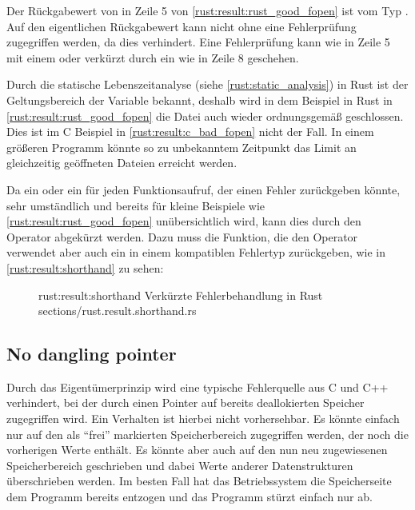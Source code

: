 Der Rückgabewert von  in Zeile 5 von \autoref{rust:result:rust_good_fopen} ist vom Typ .
Auf den eigentlichen Rückgabewert  kann nicht ohne eine Fehlerprüfung zugegriffen werden, da dies  verhindert.
Eine Fehlerprüfung kann wie in Zeile 5 mit einem  oder verkürzt durch ein  wie in Zeile 8 geschehen.

Durch die statische Lebenszeitanalyse (siehe \autoref{rust:static_analysis}) in Rust ist der Geltungsbereich der  Variable bekannt, deshalb wird in dem Beispiel in Rust in \autoref{rust:result:rust_good_fopen} die Datei auch wieder ordnungsgemäß geschlossen.
Dies ist im C Beispiel in \autoref{rust:result:c_bad_fopen} nicht der Fall.
In einem größeren Programm könnte so zu unbekanntem Zeitpunkt das Limit an gleichzeitig geöffneten Dateien erreicht werden.

Da ein  oder ein  für jeden Funktionsaufruf, der einen Fehler zurückgeben könnte, sehr umständlich und bereits für kleine Beispiele wie \autoref{rust:result:rust_good_fopen} unübersichtlich wird, kann dies durch den Operator  abgekürzt werden.
Dazu muss die Funktion, die den Operator verwendet aber auch ein  in einem kompatiblen Fehlertyp zurückgeben, wie in \autoref{rust:result:shorthand} zu sehen:

\begin{figure}[H]
	\rustcinclude
		{rust:result:shorthand}
		{Verkürzte Fehlerbehandlung in Rust}
		{sections/rust.result.shorthand.rs}
\end{figure}



\subsection{No dangling pointer}
\label{rust:guarantee:no_dangling_pointer}

Durch das Eigentümerprinzip wird eine typische Fehlerquelle aus C und C++ verhindert, bei der durch einen Pointer auf bereits deallokierten Speicher zugegriffen wird.
Ein Verhalten ist hierbei nicht vorhersehbar. Es könnte einfach nur auf den als \enquote{frei} markierten Speicherbereich zugegriffen werden, der noch die vorherigen Werte enthält.
Es könnte aber auch auf den nun neu zugewiesenen Speicherbereich geschrieben und dabei Werte anderer Datenstrukturen überschrieben werden.
Im besten Fall hat das Betriebssystem die Speicherseite dem Programm bereits entzogen und das Programm stürzt einfach nur ab.


